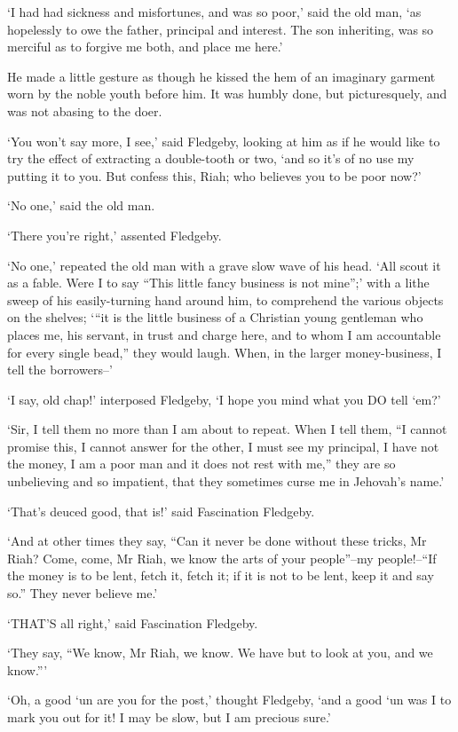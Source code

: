 ‘I had had sickness and misfortunes, and was so poor,’ said the old
man, ‘as hopelessly to owe the father, principal and interest. The son
inheriting, was so merciful as to forgive me both, and place me here.’

He made a little gesture as though he kissed the hem of an imaginary
garment worn by the noble youth before him. It was humbly done, but
picturesquely, and was not abasing to the doer.

‘You won’t say more, I see,’ said Fledgeby, looking at him as if he
would like to try the effect of extracting a double-tooth or two, ‘and
so it’s of no use my putting it to you. But confess this, Riah; who
believes you to be poor now?’

‘No one,’ said the old man.

‘There you’re right,’ assented Fledgeby.

‘No one,’ repeated the old man with a grave slow wave of his head. ‘All
scout it as a fable. Were I to say “This little fancy business is not
mine”;’ with a lithe sweep of his easily-turning hand around him,
to comprehend the various objects on the shelves; ‘“it is the little
business of a Christian young gentleman who places me, his servant, in
trust and charge here, and to whom I am accountable for every single
bead,” they would laugh. When, in the larger money-business, I tell the
borrowers--’

‘I say, old chap!’ interposed Fledgeby, ‘I hope you mind what you DO
tell ‘em?’

‘Sir, I tell them no more than I am about to repeat. When I tell them,
“I cannot promise this, I cannot answer for the other, I must see my
principal, I have not the money, I am a poor man and it does not rest
with me,” they are so unbelieving and so impatient, that they sometimes
curse me in Jehovah’s name.’

‘That’s deuced good, that is!’ said Fascination Fledgeby.

‘And at other times they say, “Can it never be done without these
tricks, Mr Riah? Come, come, Mr Riah, we know the arts of your
people”--my people!--“If the money is to be lent, fetch it, fetch it; if
it is not to be lent, keep it and say so.” They never believe me.’

‘THAT’S all right,’ said Fascination Fledgeby.

‘They say, “We know, Mr Riah, we know. We have but to look at you, and
we know.”’

‘Oh, a good ‘un are you for the post,’ thought Fledgeby, ‘and a good ‘un
was I to mark you out for it! I may be slow, but I am precious sure.’

